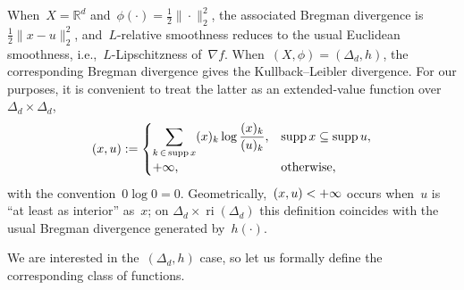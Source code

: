 \documentclass[11pt]{article}
\numberwithin{equation}{section}
\theoremstyle{remark}
\newcommand{\R}{\mathbb{R}}
\newcommand{\ri}{\operatorname{ri}}
\newcommand{\supp}{\operatorname{supp}}
\let\Div\relax\newcommand{\Div}{D_h}
\let\Dh\Div
\newcommand{\Simp}{\Delta_d}
\newcommand{\1}{\mathbf{1}}
\newcommand{\bnabla}{\nabla}
\begin{document}
When~$X = \R^d$ and~$\phi(\cdot) = \frac{1}{2} \|\cdot\|_2^2$, the associated Bregman divergence is~$\frac{1}{2}\|x-u\|_2^2$, and~$L$-relative smoothness reduces to the usual Euclidean smoothness, i.e.,~$L$-Lipschitzness of~$\bnabla f$.
%
When~$(X,\phi) = (\Simp,h)$, the corresponding Bregman divergence gives the Kullback--Leibler divergence. 
For our purposes, it is convenient to treat the latter as an extended-value function over~$\Simp \times \Simp$,
\begin{equation}
\label{eq:intro-kl}
        \Div(x,u)
        :=
        \begin{cases}
        \displaystyle
        \sum_{k \,\in\, \supp x} (x)_k\log\frac{(x)_k}{(u)_k},
        & \supp x\subseteq\supp u,\\[1.2ex]
        +\infty,
        & \text{otherwise},
        \end{cases}
\end{equation}
with the convention~$0\log 0 = 0$.
Geometrically,~$\Div(x,u) < +\infty$ occurs when~$u$ is ``at least as interior'' as~$x$;
on \(\Simp\times\ri(\Simp)\) this definition coincides with the usual Bregman divergence generated by~$h(\cdot)$. 

%
We are interested in the~$(\Simp,h)$ case, so let us formally define the corresponding class of functions.
\end{document}
